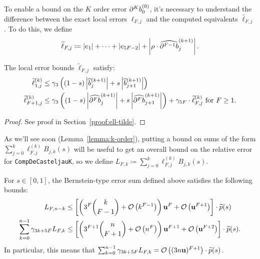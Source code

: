 To enable a bound on the \(K\) order error \(\db{K}^{(0)}_0\), it's necessary
to understand the difference between the exact local errors \(\ell_{F, j}\)
and the computed equivalents \(\widehat{\ell}_{F, j}\). To do this, we define
\begin{equation}
\widetilde{\ell}_{F, j} \coloneqq \left|e_1\right| +
\cdots + \left|e_{5F - 2}\right| + \left|\rho \cdot
\cdb{F - 1}_j^{(k + 1)}\right|.
\end{equation}

\begin{lemma}\label{lemma:ell-tilde}
The local error bounds \(\widetilde{\ell}_{F, j}\) satisfy:
\begin{align}
\widetilde{\ell}_{1, j}^{(k)} &\leq
  \gamma_3 \left(
  (1 - s) \left|\widehat{b}_j^{(k + 1)}\right| +
  s \left|\widehat{b}_{j + 1}^{(k + 1)}\right|\right)
  \label{eq:ell-tilde-1} \\
\widetilde{\ell}_{F + 1, j}^{(k)} &\leq
  \gamma_3 \left(
  (1 - s) \left|\cdb{F}_j^{(k + 1)}\right| +
  s \left|\cdb{F}_{j + 1}^{(k + 1)}\right|\right) +
  \gamma_{5F} \cdot \widetilde{\ell}_{F, j}^{(k)}
  \text{ for } F \geq 1.
\end{align}
\end{lemma}

\begin{proof}
See proof in Section~\ref{proof:ell-tilde}.
\end{proof}

As we'll see soon (Lemma~\ref{lemma:k-order}), putting a bound on
sums of the form \(\sum_{j = 0}^k \ell_{F, j}^{(k)} B_{j, k}(s)\) will
be useful to get an overall bound on the relative error for
\texttt{CompDeCasteljauK}, so we define
\(L_{F, k} \coloneqq \sum_{j = 0}^k \ell_{F, j}^{(k)} B_{j, k}(s)\).

\begin{lemma}\label{lemma:L-and-D-bounds}
For \(s \in \left[0, 1\right]\), the Bernstein-type error sum defined above
satisfies the following bounds:
\begin{align}
L_{F, n - k} &\leq \left[\left(3^F \binom{k}{F - 1} + \mathcal{O}\left(k^{F - 1}\right)\right)
  \mathbf{u}^F + \mathcal{O}\left(\mathbf{u}^{F + 1}\right)\right] \cdot \widetilde{p}(s) \\
\sum_{k = 0}^{n - 1} \gamma_{3k + 5F} L_{F, k} &\leq
  \left[\left(3^{F + 1} \binom{n}{F + 1} + \mathcal{O}\left(n^F\right)\right)
  \mathbf{u}^{F + 1} + \mathcal{O}\left(\mathbf{u}^{F + 2}\right)\right] \cdot \widetilde{p}(s).
  \label{eq:L-sum-bound}
\end{align}
In particular, this means that
\(\sum_{k = 0}^{n - 1} \gamma_{3k + 5F} L_{F, k} =
\mathcal{O}\left((3 n \mathbf{u})^{F + 1}\right) \cdot \widetilde{p}(s)\).
\end{lemma}

